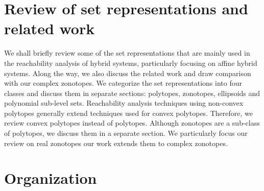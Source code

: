 



\section{Review of set representations and related work}
We shall briefly review some of the set representations that are
mainly used in the reachability analysis of hybrid systems,
particularly focusing on affine hybrid systems.  Along the way, we
also discuss the related work and draw comparison with our complex
zonotopes.  We categorize the set representations into four classes
and discuss them in separate sections: polytopes, zonotopes,
ellipsoids and polynomial sub-level sets.  Reachability analysis
techniques using non-convex polytopes generally extend techniques used
for convex polytopes.  Therefore, we review convex polytopes instead
of polytopes.  Although zonotopes are a sub-class of polytopes, we
discuss them in a separate section.  We particularly focus our review
on real zonotopes our work extends them to complex zonotopes.
%


\section{Organization}


